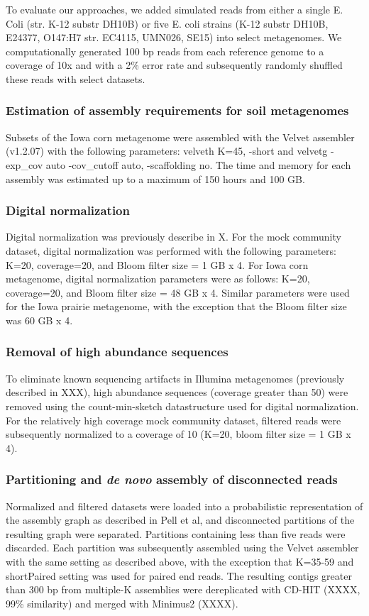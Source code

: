 \documentclass[11pt]{article} %
\begin{document}
To evaluate our approaches, we added simulated reads from either a single E. Coli (str. K-12 substr DH10B) or five E. coli strains (K-12 substr DH10B, E24377, O147:H7 str. EC4115, UMN026, SE15) into select metagenomes.  We computationally generated 100 bp reads from each reference genome to a coverage of 10x and with a 2\% error rate and subsequently randomly shuffled these reads with select datasets.

\subsubsection{Estimation of assembly requirements for soil metagenomes}
Subsets of the Iowa corn metagenome were assembled with the Velvet assembler (v1.2.07) with the following parameters:  velveth K=45, -short and velvetg -exp\_cov auto -cov\_cutoff auto, -scaffolding no.  The time and memory for each assembly was estimated up to a maximum of 150 hours and 100 GB.

\subsubsection{Digital normalization}
Digital normalization was previously describe in X.  For the mock community dataset, digital normalization was performed with the following parameters:  K=20, coverage=20, and Bloom filter size = 1 GB x 4.  For Iowa corn metagenome, digital normalization parameters were as follows:  K=20, coverage=20, and Bloom filter size = 48 GB x 4.  Similar parameters were used for the Iowa prairie metagenome, with the exception that the Bloom filter size was 60 GB x 4.

\subsubsection{Removal of high abundance sequences}
To eliminate known sequencing artifacts in Illumina metagenomes (previously described in XXX), high abundance sequences (coverage greater than 50) were removed using the count-min-sketch datastructure used for digital normalization.  For the relatively high coverage mock community dataset, filtered reads were subsequently normalized to a coverage of 10 (K=20, bloom filter size = 1 GB x 4).  

\subsubsection{Partitioning and \emph{de novo} assembly of disconnected reads}
Normalized and filtered datasets were loaded into a probabilistic representation of the assembly graph as described in Pell et al, and disconnected partitions of the resulting graph were separated.  Partitions containing less than five reads were discarded.  Each partition was subsequently assembled using the Velvet assembler with the same setting as described above, with the exception that K=35-59 and shortPaired setting was used for paired end reads.  The resulting contigs greater than 300 bp from multiple-K assemblies were dereplicated with CD-HIT (XXXX, 99\% similarity) and merged with Minimus2 (XXXX).  
\end{document}
